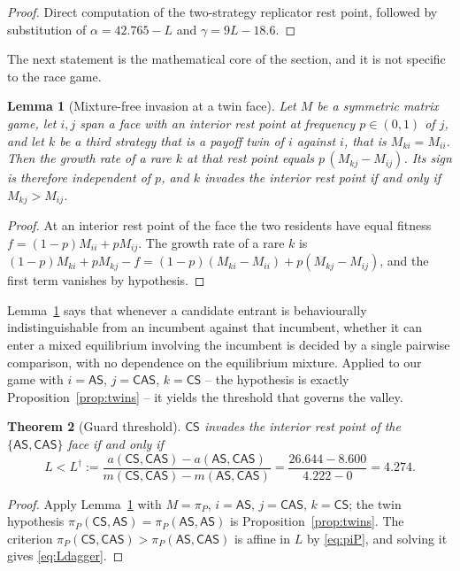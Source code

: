 \documentclass[pdflatex]{sn-jnl}
\theoremstyle{thmstyleone}
\newtheorem{theorem}{Theorem}
\newtheorem{lemma}[theorem]{Lemma}
\theoremstyle{thmstylethree}
\theoremstyle{thmstyletwo}
\newcommand{\AS}{\textsf{AS}}
\newcommand{\CS}{\textsf{CS}}
\newcommand{\CAS}{\textsf{CAS}}
\newcommand{\piP}{\pi_{P}}
\begin{document}
\begin{proof}
Direct computation of the two-strategy replicator rest point, followed by
substitution of $\alpha=42.765-L$ and $\gamma=9L-18.6$.
\end{proof}

The next statement is the mathematical core of the section, and it is not
specific to the race game.

\begin{lemma}[Mixture-free invasion at a twin face]\label{lem:twin}
Let $M$ be a symmetric matrix game, let $i,j$ span a face with an interior
rest point at frequency $p\in(0,1)$ of $j$, and let $k$ be a third strategy
that is a payoff twin of $i$ against $i$, that is $M_{ki}=M_{ii}$. Then the
growth rate of a rare $k$ at that rest point equals
$p\,(M_{kj}-M_{ij})$. Its sign is therefore independent of $p$, and $k$
invades the interior rest point if and only if $M_{kj}>M_{ij}$.
\end{lemma}

\begin{proof}
At an interior rest point of the face the two residents have equal fitness
$f=(1-p)M_{ii}+pM_{ij}$. The growth rate of a rare $k$ is
$(1-p)M_{ki}+pM_{kj}-f=(1-p)(M_{ki}-M_{ii})+p(M_{kj}-M_{ij})$, and the first
term vanishes by hypothesis.
\end{proof}

Lemma~\ref{lem:twin} says that whenever a candidate entrant is behaviourally
indistinguishable from an incumbent against that incumbent, whether it can
enter a mixed equilibrium involving the incumbent is decided by a single
pairwise comparison, with no dependence on the equilibrium mixture. Applied to
our game with $i=\AS$, $j=\CAS$, $k=\CS$ -- the hypothesis is exactly
Proposition~\ref{prop:twins} -- it yields the threshold that governs the
valley.

\begin{theorem}[Guard threshold]\label{thm:guard}
$\CS$ invades the interior rest point of the $\{\AS,\CAS\}$ face if and only
if
\begin{equation}
L<L^{\dagger}:=\frac{a(\CS,\CAS)-a(\AS,\CAS)}{m(\CS,\CAS)-m(\AS,\CAS)}
=\frac{26.644-8.600}{4.222-0}=4.274 .
\label{eq:Ldagger}
\end{equation}
\end{theorem}

\begin{proof}
Apply Lemma~\ref{lem:twin} with $M=\piP$, $i=\AS$, $j=\CAS$, $k=\CS$; the twin
hypothesis $\piP(\CS,\AS)=\piP(\AS,\AS)$ is Proposition~\ref{prop:twins}. The
criterion $\piP(\CS,\CAS)>\piP(\AS,\CAS)$ is affine in $L$ by \eqref{eq:piP},
and solving it gives \eqref{eq:Ldagger}.
\end{proof}
\end{document}

